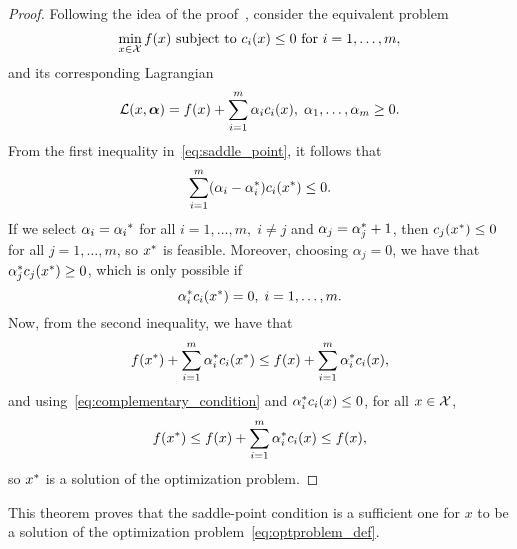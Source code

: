\begin{proof}
Following the idea of the proof~\citep{ScholkopfS02}, consider the equivalent problem
    \begin{equation}
        \nonumber
        \min_{x \in \mathcal{X}} f(x) \text{ subject to } c_i(x) \leq 0 \text{ for } i=1, \ldots, m ,
    \end{equation}
and its corresponding Lagrangian
\begin{equation}
    \nonumber
    \mathcal{L}(x, \bm{\alpha}) = f(x) + \sum_{i=1}^m \alpha_i c_i(x) , \; \alpha_1, \ldots, \alpha_m \geq 0 .
\end{equation}
From the first inequality in~\eqref{eq:saddle_point}, it follows that 
$$ \sum_{i=1}^m (\alpha_i- {\alpha}^*_i) c_i({x}^*) \leq 0 .$$
If we select $\alpha_i = {\alpha_i}^*$ for all $i=1, \ldots, m,\; i \neq j$ and $\alpha_{j} = {\alpha}^*_{j} + 1$, then
$c_j({x}^*) \leq 0$ for all $j=1, \ldots, m$, so ${x}^*$ is feasible.
%
Moreover, choosing $\alpha_{j} = 0$, we have that ${\alpha}^*_j c_j({x}^*) \geq 0$, which is only possible if 
\begin{equation}\label{eq:complementary_condition}
    \opt{\alpha}_i c_i(\opt{x}) = 0 , \; i=1, \ldots, m .
\end{equation}
Now, from the second inequality, we have that
\begin{equation}
    \nonumber
    f({x}^*) + \sum_{i=1}^m {\alpha}^*_i c_i({x}^*) \leq f(x) + \sum_{i=1}^m {\alpha}^*_i c_i(x) ,
\end{equation}
and using~\eqref{eq:complementary_condition} and ${\alpha}^*_i c_i(x) \leq 0$, for all $x \in \mathcal{X}$,
\begin{equation}
    \nonumber
    f({x}^*) \leq f(x) + \sum_{i=1}^m {\alpha}^*_i c_i(x) \leq f(x) ,
\end{equation}
so ${x}^*$ is a solution of the optimization problem.
\end{proof}
%
This theorem proves that the saddle-point condition is a sufficient one for $x$ to be a solution of the optimization problem~\eqref{eq:optproblem_def}.

